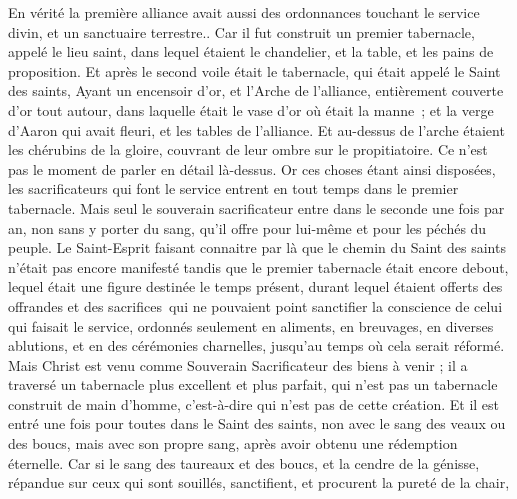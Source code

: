 \begin{multicols}{2}
\VerseOne{}En vérité la première alliance avait aussi des ordonnances touchant le service divin, et un sanctuaire terrestre..
Car il fut construit un premier tabernacle, appelé le lieu saint, dans lequel étaient le chandelier, et la table, et les pains de proposition.
Et après le second voile était le tabernacle, qui était appelé le Saint des saints,
Ayant un encensoir d’or, et l’Arche de l’alliance, entièrement couverte d’or tout autour, dans laquelle était le vase d’or où était la manne ; et la verge d’Aaron qui avait fleuri, et les tables de l’alliance.
Et au-dessus de l'arche étaient les chérubins de la gloire, couvrant de leur ombre sur le propitiatoire. Ce n’est pas le moment de parler en détail là-dessus.
Or ces choses étant ainsi disposées, les sacrificateurs qui font le service entrent en tout temps dans le premier tabernacle.
Mais seul le souverain sacrificateur entre dans le seconde une fois par an, non sans y porter du sang, qu’il offre pour lui-même et pour les péchés du peuple.
Le Saint-Esprit faisant connaitre par là que le chemin du Saint des saints n'était pas encore manifesté tandis que le premier tabernacle était encore debout,
lequel était une figure destinée le temps présent, durant lequel étaient offerts des offrandes et des sacrifices qui ne pouvaient point sanctifier la conscience de celui qui faisait le service,
ordonnés seulement en aliments, en breuvages, en diverses ablutions, et en des cérémonies charnelles, jusqu’au temps où cela serait réformé.
Mais Christ est venu comme Souverain Sacrificateur des biens à venir ; il a traversé un tabernacle plus excellent et plus parfait, qui n'est pas un tabernacle construit de main d’homme, c'est-à-dire qui n’est pas de cette création.
Et il est entré une fois pour toutes dans le Saint des saints, non avec le sang des veaux ou des boucs, mais avec son propre sang, après avoir obtenu une rédemption éternelle.
Car si le sang des taureaux et des boucs, et la cendre de la génisse, répandue sur ceux qui sont souillés, sanctifient, et procurent la pureté de la chair,

\end{multicols}
